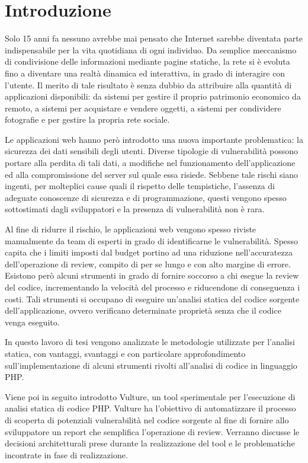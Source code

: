 \chapter{Introduzione}
Solo 15 anni fa nessuno avrebbe mai pensato che Internet sarebbe diventata parte indispensabile per la vita quotidiana di ogni individuo. Da semplice meccanismo di condivisione delle informazioni mediante pagine statiche, la rete si è evoluta fino a diventare una realtà dinamica ed interattiva, in grado di interagire con l'utente.
Il merito di tale risultato è senza dubbio da attribuire alla quantità di applicazioni disponibili: da sistemi per gestire il proprio patrimonio economico da remoto, a sistemi per acquistare e vendere oggetti, a sistemi per condividere fotografie e per gestire la propria rete sociale.

Le applicazioni web hanno però introdotto una nuova importante problematica: la sicurezza dei dati sensibili degli utenti. Diverse tipologie di vulnerabilità possono portare alla perdita di tali dati, a modifiche nel funzionamento dell'applicazione ed alla compromissione del server sul quale essa risiede. Sebbene tale rischi siano ingenti, per molteplici cause quali il rispetto delle tempistiche, l'assenza di adeguate conoscenze di sicurezza e di programmazione, questi vengono spesso sottostimati dagli sviluppatori e la presenza di vulnerabilità non è rara.

Al fine di ridurre il rischio, le applicazioni web vengono spesso riviste manualmente da team di esperti in grado di identificarne le vulnerabilità. Spesso capita che i limiti imposti dal budget portino ad una riduzione nell'accuratezza dell'operazione di review, compito di per se lungo e con alto margine di errore.\\
Esistono però alcuni strumenti in grado di fornire soccorso a chi esegue la review del codice, incrementando la velocità del processo e riducendone di conseguenza i costi. Tali strumenti si occupano di eseguire un'analisi statica del codice sorgente dell'applicazione, ovvero verificano determinate proprietà senza che il codice venga eseguito.

In questo lavoro di tesi vengono analizzate le metodologie utilizzate per l'analisi statica, con vantaggi, svantaggi e con particolare approfondimento sull'implementazione di alcuni strumenti rivolti all'analisi di codice in linguaggio PHP.

Viene poi in seguito introdotto Vulture, un tool sperimentale per l'esecuzione di analisi statica di codice PHP. Vulture ha l'obiettivo di automatizzare il processo di scoperta di potenziali vulnerabilità nel codice sorgente al fine di fornire allo sviluppatore un report che semplifica l'operazione di review. Verranno discusse le decisioni architetturali prese durante la realizzazione del tool e le problematiche incontrate in fase di realizzazione.